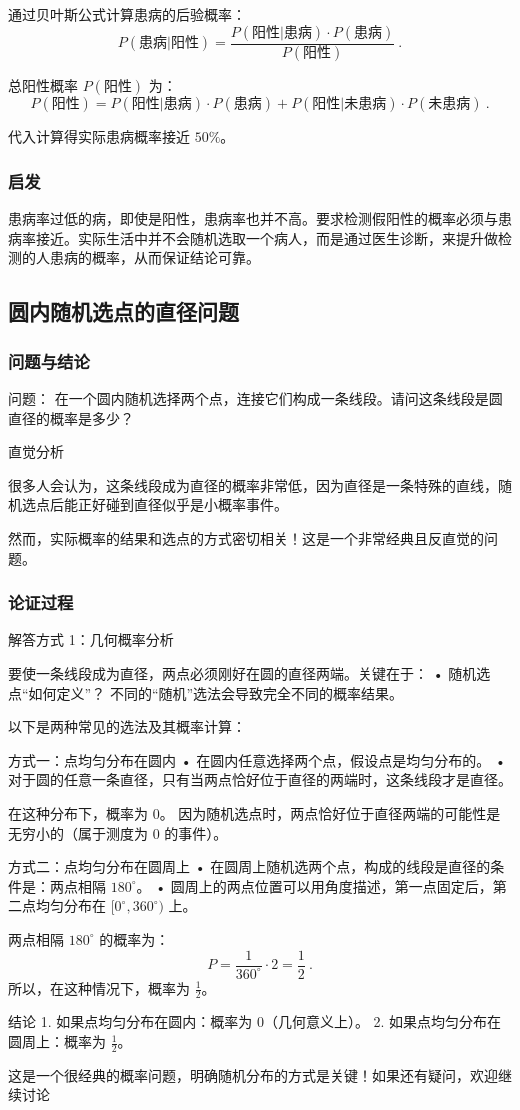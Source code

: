 通过贝叶斯公式计算患病的后验概率：
$$
P(\text{患病}|\text{阳性}) = \frac{P(\text{阳性}|\text{患病}) \cdot P(\text{患病})}{P(\text{阳性})}~.
$$

总阳性概率 $P(\text{阳性})$ 为：
$$
P(\text{阳性}) = P(\text{阳性}|\text{患病}) \cdot P(\text{患病}) + P(\text{阳性}|\text{未患病}) \cdot P(\text{未患病})~.
$$

代入计算得实际患病概率接近 $50\%$。

\subsubsection{启发}

患病率过低的病，即使是阳性，患病率也并不高。要求检测假阳性的概率必须与患病率接近。实际生活中并不会随机选取一个病人，而是通过医生诊断，来提升做检测的人患病的概率，从而保证结论可靠。


\subsection{圆内随机选点的直径问题}

\subsubsection{问题与结论}
问题：
在一个圆内随机选择两个点，连接它们构成一条线段。请问这条线段是圆直径的概率是多少？

直觉分析

很多人会认为，这条线段成为直径的概率非常低，因为直径是一条特殊的直线，随机选点后能正好碰到直径似乎是小概率事件。

然而，实际概率的结果和选点的方式密切相关！这是一个非常经典且反直觉的问题。


\subsubsection{论证过程}
解答方式 1：几何概率分析

要使一条线段成为直径，两点必须刚好在圆的直径两端。关键在于：
	•	随机选点“如何定义”？
不同的“随机”选法会导致完全不同的概率结果。

以下是两种常见的选法及其概率计算：

方式一：点均匀分布在圆内
	•	在圆内任意选择两个点，假设点是均匀分布的。
	•	对于圆的任意一条直径，只有当两点恰好位于直径的两端时，这条线段才是直径。

在这种分布下，概率为 0。
因为随机选点时，两点恰好位于直径两端的可能性是无穷小的（属于测度为 0 的事件）。

方式二：点均匀分布在圆周上
	•	在圆周上随机选两个点，构成的线段是直径的条件是：两点相隔 $180^\circ$。
	•	圆周上的两点位置可以用角度描述，第一点固定后，第二点均匀分布在 $[0^\circ, 360^\circ)$ 上。

两点相隔 $180^\circ$ 的概率为：
$$
P = \frac{1}{360^\circ} \cdot 2 = \frac{1}{2}~.
$$
所以，在这种情况下，概率为 $\frac{1}{2}$。

结论
	1.	如果点均匀分布在圆内：概率为 $0$（几何意义上）。
	2.	如果点均匀分布在圆周上：概率为 $\frac{1}{2}$。

这是一个很经典的概率问题，明确随机分布的方式是关键！如果还有疑问，欢迎继续讨论~